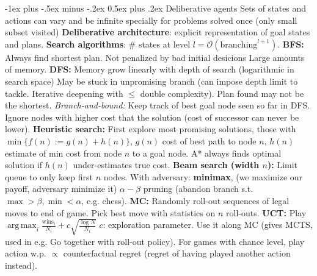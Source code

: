 \documentclass{article}
\makeatletter
\DeclareMathOperator*{\argmax}{arg\,max}
\renewcommand{\section}{\@startsection{section}{1}{0mm}%
                                {-1ex plus -.5ex minus -.2ex}%
                                {0.5ex plus .2ex}%
                                {\color{blue}\normalfont\footnotesize\bfseries}}
\newcommand{\disadv}[1]{{\color{red} #1}}
\newcommand{\adv}[1]{{\color{green!60!blue} #1}}
\makeatother
\begin{document}
\begin{multicols*}{4}
\section{Deliberative agents}
\adv{Sets of states and actions can vary and be infinite specially for problems solved once (only small subset visited)}
\textbf{Deliberative architecture}: explicit representation of goal states and plans.
\textbf{Search algorithms}: \# states at level $l=\mathcal{O}(\text{branching}^{l+1})$. \textbf{BFS: }\adv{Always find shortest plan. Not penalized by bad initial desicions} \disadv{Large amounts of memory}. \textbf{DFS: }\adv{Memory grow linearly with depth of search (logarithmic in search space)} \disadv{May be stuck in unpromising branch} (can impose depth limit to tackle. Iterative deepening with $\leq$ double complexity). \disadv{Plan found may not be the shortest}. \textit{Branch-and-bound: }Keep track of best goal node seen so far in DFS. Ignore nodes with higher cost that the solution (cost of successor can never be lower). \textbf{Heuristic search: }First explore most promising solutions, those with $\min \{f(n):=g(n)+h(n)\}$, $g(n)$ cost of best path to node $n$, $h(n)$ estimate of min cost from node $n$ to a goal node. \adv{A* always finds optimal solution if $h(n)$ under-estimates true cost}. \textbf{Beam search (width $n$): }Limit queue to only keep first $n$ nodes. With adversary: \textbf{minimax}, (we maximize our payoff, adversary minimize it) $\alpha-\beta$ pruning (abandon branch s.t. $\max >\beta,\min<\alpha$, e.g. chess). \textbf{MC: }Randomly roll-out sequences of legal moves to end of game. Pick best move with statistics on $n$ roll-outs. \textbf{UCT:} Play $\argmax_i \frac{\text{wins}_i}{N_i} + c\sqrt{\frac{\log N}{N_i}}$ $c$: exploration parameter. Use it along MC (gives MCTS, used in e.g. Go together with roll-out policy). For games with chance level, play action w.p. $\propto$ counterfactual regret (regret of having played another action instead).


\end{multicols*}
\end{document}
